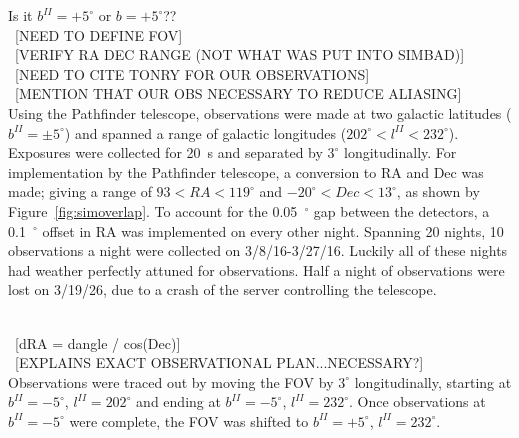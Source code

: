 \documentclass[aps,prb,twocolumn,superscriptaddress]{revtex4-1}
\begin{document}
Is it $b^{II}=+5^{\circ}$ or $b=+5^{\circ}$??\\
~[NEED TO DEFINE FOV]\\
~[VERIFY RA DEC RANGE (NOT WHAT WAS PUT INTO SIMBAD)]\\
~[NEED TO CITE TONRY FOR OUR OBSERVATIONS]\\
~[MENTION THAT OUR OBS NECESSARY TO REDUCE ALIASING]\\

Using the Pathfinder telescope, observations were made at two galactic latitudes ($b^{II}=\pm5^{\circ}$) and spanned a range of galactic longitudes ($202^{\circ} < l^{II} < 232^{\circ}$).  
Exposures were collected for 20~s and separated by $3^{\circ}$ longitudinally.  For implementation by the Pathfinder telescope, a conversion to RA and Dec was made; giving a range of $93 < RA < 119^{\circ}$ and $-20^{\circ} < Dec < 13^{\circ}$, as shown by Figure~\ref{fig:simoverlap}.  To account for the 0.05~$^{\circ}$ gap between the detectors, a 0.1~$^{\circ}$ offset in RA was implemented on every other night.  
Spanning 20 nights, 10 observations a night were collected on 3/8/16-3/27/16.  Luckily all of these nights had weather perfectly attuned for observations.  Half a night of observations were lost on 3/19/26, due to a crash of the server controlling the telescope.


~\\~[dRA = dangle / cos(Dec)]
~\\~[EXPLAINS EXACT OBSERVATIONAL PLAN...NECESSARY?]\\
Observations were traced out by moving the FOV by $3^{\circ}$ longitudinally, starting at $b^{II}=-5^{\circ}$, $l^{II}=202^{\circ}$ and ending at $b^{II}=-5^{\circ}$, $l^{II}=232^{\circ}$.  Once observations at $b^{II}=-5^{\circ}$ were complete, the FOV was shifted to $b^{II}=+5^{\circ}$, $l^{II}=232^{\circ}$.
\end{document}

